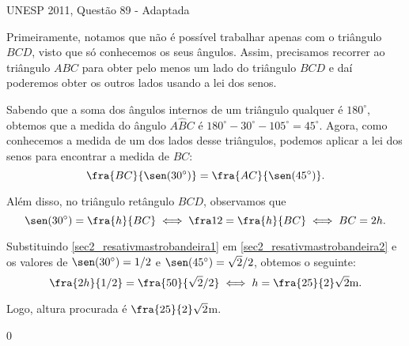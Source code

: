 \begin{answer}{UNESP 2011, Questão 89 - Adaptada}
{
Primeiramente, notamos que não é possível trabalhar apenas com o triângulo $BCD$, visto que só conhecemos os seus ângulos. Assim, precisamos recorrer ao triângulo $ABC$ para obter pelo menos um lado do triângulo $BCD$ e daí poderemos obter os outros lados usando a lei dos senos.

Sabendo que a soma dos ângulos internos de um triângulo qualquer é $180^\circ$, obtemos que a medida do ângulo  $A\hat{B}C$ é $180^\circ-30^\circ-105^\circ=45^\circ$.  Agora, como conhecemos a medida de um dos lados desse triângulos, podemos aplicar a lei dos senos para encontrar a medida de $BC$:
\begin{equation}\label{sec2_resativmastrobandeira2}
    \fra{BC}{\sen(30^\circ)}=\fra{AC}{\sen(45^\circ)}.
\end{equation}

Além disso, no triângulo retângulo $BCD$, observamos que
\begin{equation}\label{sec2_resativmastrobandeira1}
    \sen(30^\circ)=\fra{h}{BC} \iff \fra12=\fra{h}{BC} \iff BC=2h.
\end{equation}

Substituindo \eqref{sec2_resativmastrobandeira1} em \eqref{sec2_resativmastrobandeira2} e os valores de $\sen(30^\circ)=1/2$ e $\sen(45^\circ)=\sqrt{2}/2$, obtemos o seguinte:
$$\fra{2h}{1/2}=\fra{50}{\sqrt{2}/2} \iff h=\fra{25}{2}\sqrt{2}\text{m}.$$

Logo, altura procurada é $\fra{25}{2}\sqrt{2}$m.
}{0}
\end{answer}


